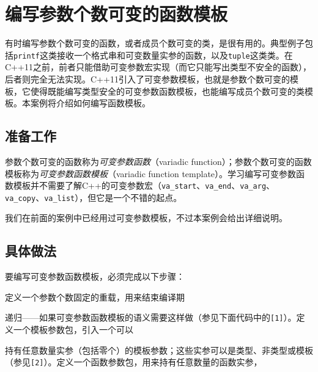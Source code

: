 
\section{编写参数个数可变的函数模板}



有时编写参数个数可变的函数，或者成员个数可变的类，是很有用的。典型例子包括\texttt{printf}这类接收一个格式串和可变数量实参的函数，以及\texttt{tuple}这类类。在C++11之前，前者只能借助可变参数宏实现（而它只能写出类型不安全的函数），后者则完全无法实现。C++11引入了可变参数模板，也就是参数个数可变的模板，它使得既能编写类型安全的可变参数函数模板，也能编写成员个数可变的类模板。本案例将介绍如何编写函数模板。



\subsection{准备工作}



参数个数可变的函数称为\textit{可变参数函数}（variadic function）；参数个数可变的函数模板称为\textit{可变参数函数模板}（variadic function template）。学习编写可变参数函数模板并不需要了解C++的可变参数宏（\texttt{va\_\allowbreak{}start}、\texttt{va\_\allowbreak{}end}、\texttt{va\_\allowbreak{}arg}、\texttt{va\_\allowbreak{}copy}、\texttt{va\_\allowbreak{}list}），但它是一个不错的起点。



我们在前面的案例中已经用过可变参数模板，不过本案例会给出详细说明。



\subsection{具体做法}



要编写可变参数函数模板，必须完成以下步骤：



定义一个参数个数固定的重载，用来结束编译期



递归——如果可变参数函数模板的语义需要这样做（参见下面代码中的\texttt{[1]}）。定义一个模板参数包，引入一个可以



持有任意数量实参（包括零个）的模板参数；这些实参可以是类型、非类型或模板（参见\texttt{[2]}）。定义一个函数参数包，用来持有任意数量的函数实参，


